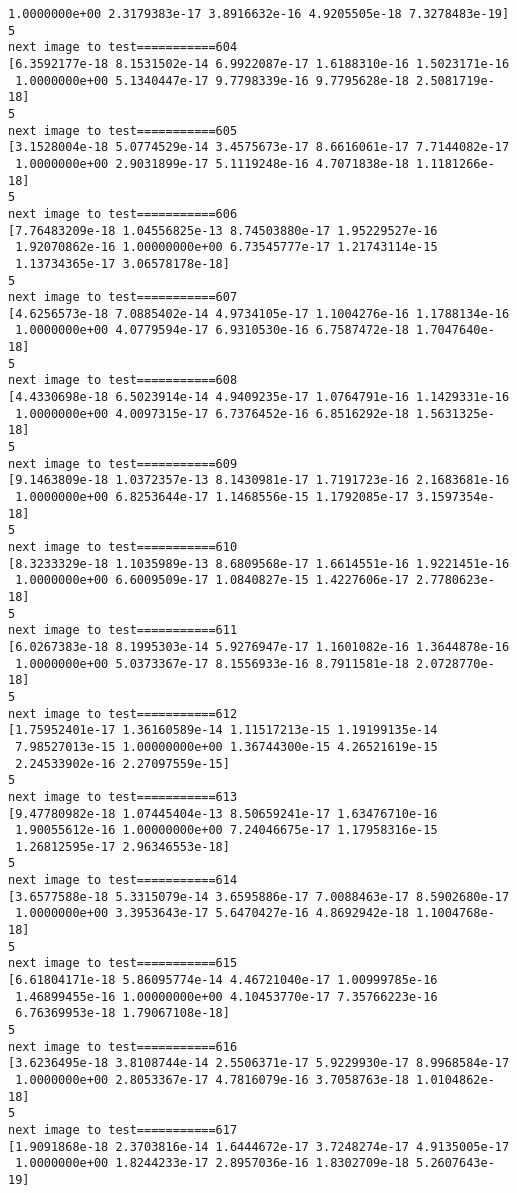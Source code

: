 \documentclass[11pt]{article}
\begin{document}
\begin{Verbatim}[commandchars=\\\{\}]
 1.0000000e+00 2.3179383e-17 3.8916632e-16 4.9205505e-18 7.3278483e-19]
5
next image to test===========604
[6.3592177e-18 8.1531502e-14 6.9922087e-17 1.6188310e-16 1.5023171e-16
 1.0000000e+00 5.1340447e-17 9.7798339e-16 9.7795628e-18 2.5081719e-18]
5
next image to test===========605
[3.1528004e-18 5.0774529e-14 3.4575673e-17 8.6616061e-17 7.7144082e-17
 1.0000000e+00 2.9031899e-17 5.1119248e-16 4.7071838e-18 1.1181266e-18]
5
next image to test===========606
[7.76483209e-18 1.04556825e-13 8.74503880e-17 1.95229527e-16
 1.92070862e-16 1.00000000e+00 6.73545777e-17 1.21743114e-15
 1.13734365e-17 3.06578178e-18]
5
next image to test===========607
[4.6256573e-18 7.0885402e-14 4.9734105e-17 1.1004276e-16 1.1788134e-16
 1.0000000e+00 4.0779594e-17 6.9310530e-16 6.7587472e-18 1.7047640e-18]
5
next image to test===========608
[4.4330698e-18 6.5023914e-14 4.9409235e-17 1.0764791e-16 1.1429331e-16
 1.0000000e+00 4.0097315e-17 6.7376452e-16 6.8516292e-18 1.5631325e-18]
5
next image to test===========609
[9.1463809e-18 1.0372357e-13 8.1430981e-17 1.7191723e-16 2.1683681e-16
 1.0000000e+00 6.8253644e-17 1.1468556e-15 1.1792085e-17 3.1597354e-18]
5
next image to test===========610
[8.3233329e-18 1.1035989e-13 8.6809568e-17 1.6614551e-16 1.9221451e-16
 1.0000000e+00 6.6009509e-17 1.0840827e-15 1.4227606e-17 2.7780623e-18]
5
next image to test===========611
[6.0267383e-18 8.1995303e-14 5.9276947e-17 1.1601082e-16 1.3644878e-16
 1.0000000e+00 5.0373367e-17 8.1556933e-16 8.7911581e-18 2.0728770e-18]
5
next image to test===========612
[1.75952401e-17 1.36160589e-14 1.11517213e-15 1.19199135e-14
 7.98527013e-15 1.00000000e+00 1.36744300e-15 4.26521619e-15
 2.24533902e-16 2.27097559e-15]
5
next image to test===========613
[9.47780982e-18 1.07445404e-13 8.50659241e-17 1.63476710e-16
 1.90055612e-16 1.00000000e+00 7.24046675e-17 1.17958316e-15
 1.26812595e-17 2.96346553e-18]
5
next image to test===========614
[3.6577588e-18 5.3315079e-14 3.6595886e-17 7.0088463e-17 8.5902680e-17
 1.0000000e+00 3.3953643e-17 5.6470427e-16 4.8692942e-18 1.1004768e-18]
5
next image to test===========615
[6.61804171e-18 5.86095774e-14 4.46721040e-17 1.00999785e-16
 1.46899455e-16 1.00000000e+00 4.10453770e-17 7.35766223e-16
 6.76369953e-18 1.79067108e-18]
5
next image to test===========616
[3.6236495e-18 3.8108744e-14 2.5506371e-17 5.9229930e-17 8.9968584e-17
 1.0000000e+00 2.8053367e-17 4.7816079e-16 3.7058763e-18 1.0104862e-18]
5
next image to test===========617
[1.9091868e-18 2.3703816e-14 1.6444672e-17 3.7248274e-17 4.9135005e-17
 1.0000000e+00 1.8244233e-17 2.8957036e-16 1.8302709e-18 5.2607643e-19]

\end{Verbatim}
\end{document}
